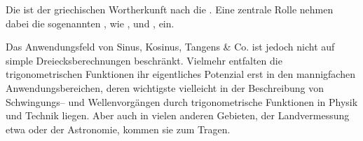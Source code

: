 \begin{MIntro}
 Die  ist der griechischen Wortherkunft nach die .
 Eine zentrale Rolle nehmen dabei die sogenannten , wie ,  und , ein.
 
 Das Anwendungsfeld von Sinus, Kosinus, Tangens \& Co. ist jedoch nicht auf
 \glqq simple{\grqq} Dreiecksberechnungen beschränkt. Vielmehr entfalten die trigonometrischen Funktionen
 ihr eigentliches Potenzial erst in den mannigfachen Anwendungsbereichen, deren wichtigste vielleicht
 in der Beschreibung von Schwingungs-- und Wellenvorgängen durch trigonometrische Funktionen in Physik und Technik liegen. Aber auch in vielen anderen
 Gebieten, der Landvermessung etwa oder der Astronomie, kommen sie zum Tragen.
 
\end{MIntro}

